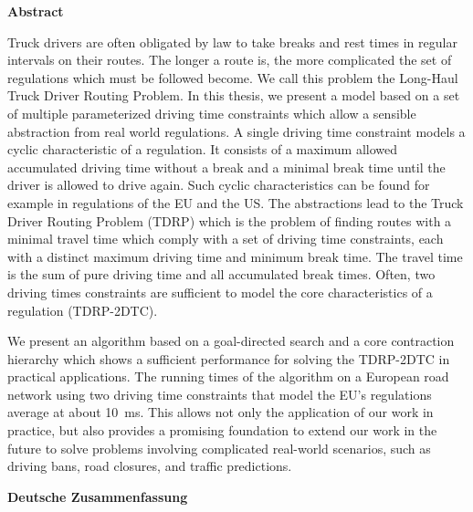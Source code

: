 \documentclass{thesisclass}
\begin{document}
\begin{addmargin}{0.5cm}
	\centerline{\textbf{Abstract}}

	Truck drivers are often obligated by law to take breaks and rest times in regular intervals on their routes. The longer a route is, the more complicated the set of regulations which must be followed become. We call this problem the Long-Haul Truck Driver Routing Problem. In this thesis, we present a model based on a set of multiple parameterized driving time constraints which allow a sensible abstraction from real world regulations. A single driving time constraint models a cyclic characteristic of a regulation. It consists of a maximum allowed accumulated driving time without a break and a minimal break time until the driver is allowed to drive again. Such cyclic characteristics can be found for example in regulations of the EU and the US. The abstractions lead to the Truck Driver Routing Problem (TDRP) which is the problem of finding routes with a minimal travel time which comply with a set of driving time constraints, each with a distinct maximum driving time and minimum break time. The travel time is the sum of pure driving time and all accumulated break times. Often, two driving times constraints are sufficient to model the core characteristics of a regulation (TDRP-2DTC).

	We present an algorithm based on a goal-directed search and a core contraction hierarchy which shows a sufficient performance for solving the TDRP-2DTC in practical applications. The running times of the algorithm on a European road network using two driving time constraints that model the EU's regulations average at about \SI{10}{\milli\second}. This allows not only the application of our work in practice, but also provides a promising foundation to extend our work in the future to solve problems involving complicated real-world scenarios, such as driving bans, road closures, and traffic predictions.

	\vskip 2cm

	\centerline{\textbf{Deutsche Zusammenfassung}}


\end{addmargin}
\end{document}
